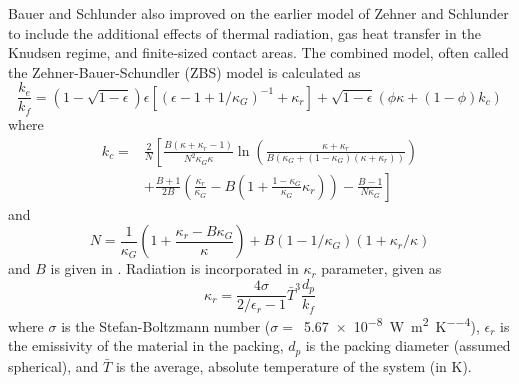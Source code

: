 Bauer and Schlunder \cite{bauer1978effective} also improved on the earlier model of Zehner and Schlunder to include the additional effects of thermal radiation, gas heat transfer in the Knudsen regime, and finite-sized contact areas. The combined model, often called the Zehner-Bauer-Schundler (ZBS) model is calculated as
\begin{equation}
    \frac{k_e}{k_f} = \left(1-\sqrt{1-\epsilon}\right)\epsilon\left[\left(\epsilon-1+1/\kappa_G\right)^{-1} + \kappa_r\right]+\sqrt{1-\epsilon}\left(\phi\kappa + (1-\phi)k_c\right)
\end{equation}
where
\begin{equation}
\begin{split}
    k_c ={} &\frac{2}{N}\left[\frac{B(\kappa+\kappa_r -1)}{N^2\kappa_G\kappa}\ln\left(\frac{\kappa+\kappa_r}{B(\kappa_G+(1-\kappa_G)(\kappa+\kappa_r))}\right) \right.\\
    &+\left.\frac{B+1}{2B}\left(\frac{\kappa_r}{\kappa_G} - B\left(1+\frac{1-\kappa_G}{\kappa_G}\kappa_r\right) \right) - \frac{B-1}{N\kappa_G}\right]
\end{split}
\end{equation}
and
\begin{equation}
    N = \frac{1}{\kappa_G}\left(1+\frac{\kappa_r-B\kappa_G}{\kappa} \right) + B(1-1/\kappa_G)(1+\kappa_r/\kappa)
\end{equation}
and $B$ is given in . Radiation is incorporated in $\kappa_r$ parameter, given as
\begin{equation}
    \kappa_r = \frac{4\sigma}{2/\epsilon_r - 1}\bar{T}^3\frac{d_p}{k_f}
\end{equation}
where $\sigma$ is the Stefan-Boltzmann number ($\sigma = $~\SI{5.67e-8}{\watt\per\meter\squared\per\kelvin\tothe{4}}), $\epsilon_r$ is the emissivity of the material in the packing, $d_p$ is the packing diameter (assumed spherical), and $\bar{T}$ is the average, absolute temperature of the system (in \si{\kelvin}). 

